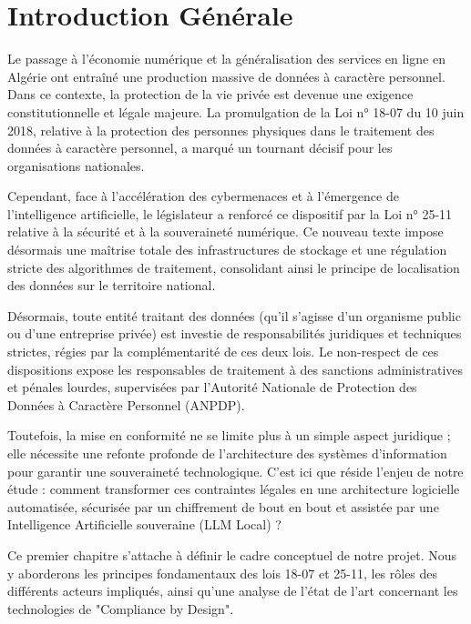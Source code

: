 \chapter*{Introduction Générale\label{intro}} 

Le passage à l'économie numérique et la généralisation des services en ligne en Algérie ont entraîné une production massive de données à caractère personnel. Dans ce contexte, la protection de la vie privée est devenue une exigence constitutionnelle et légale majeure. La promulgation de la Loi n° 18-07 du 10 juin 2018, relative à la protection des personnes physiques dans le traitement des données à caractère personnel, a marqué un tournant décisif pour les organisations nationales.

Cependant, face à l'accélération des cybermenaces et à l'émergence de l'intelligence artificielle, le législateur a renforcé ce dispositif par la Loi n° 25-11 relative à la sécurité et à la souveraineté numérique. Ce nouveau texte impose désormais une maîtrise totale des infrastructures de stockage et une régulation stricte des algorithmes de traitement, consolidant ainsi le principe de localisation des données sur le territoire national.

Désormais, toute entité traitant des données (qu'il s'agisse d'un organisme public ou d'une entreprise privée) est investie de responsabilités juridiques et techniques strictes, régies par la complémentarité de ces deux lois. Le non-respect de ces dispositions expose les responsables de traitement à des sanctions administratives et pénales lourdes, supervisées par l'Autorité Nationale de Protection des Données à Caractère Personnel (ANPDP).

Toutefois, la mise en conformité ne se limite plus à un simple aspect juridique ; elle nécessite une refonte profonde de l'architecture des systèmes d'information pour garantir une souveraineté technologique. C'est ici que réside l'enjeu de notre étude : comment transformer ces contraintes légales en une architecture logicielle automatisée, sécurisée par un chiffrement de bout en bout et assistée par une Intelligence Artificielle souveraine (LLM Local) ?

Ce premier chapitre s'attache à définir le cadre conceptuel de notre projet. Nous y aborderons les principes fondamentaux des lois 18-07 et 25-11, les rôles des différents acteurs impliqués, ainsi qu'une analyse de l'état de l'art concernant les technologies de "Compliance by Design".